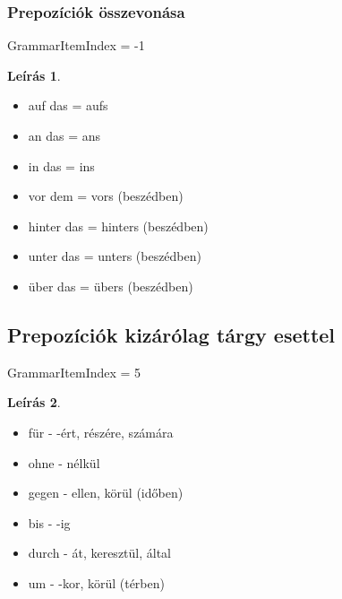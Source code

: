 \documentclass{article}
\theoremstyle{definition}
\newtheorem*{desc}{Leírás}
\begin{document}
\subsubsection{Prepozíciók összevonása}

GrammarItemIndex = -1

\begin{desc}
\begin{itemize}
\item auf das = aufs
\item an das = ans
\item in das = ins
\item vor dem = vors (beszédben)
\item hinter das = hinters (beszédben)
\item unter das = unters (beszédben)
\item über das = übers (beszédben)
\end{itemize}
\end{desc}

\subsection{Prepozíciók kizárólag tárgy esettel}

GrammarItemIndex = 5

\begin{desc}

\begin{itemize}
\item für - -ért, részére, számára
\item ohne - nélkül
\item gegen - ellen, körül (időben)
\item bis - -ig
\item durch - át, keresztül, által
\item um - -kor, körül (térben)
\end{itemize}

\end{desc}
\end{document}
